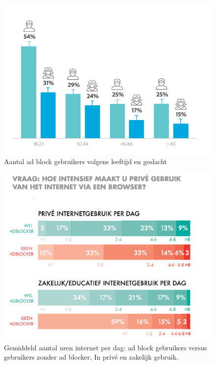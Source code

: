 \documentclass[pdftex,a4paper,12pt,twoside]{report}
\begin{document}
\begin{figure}[h!]
\centering
\includegraphics[width=12cm]{img/demographicsMV}
\caption{Aantal ad block gebruikers volgens leeftijd en geslacht}
\label{fig: Demographic_age_sex}
\end{figure}

\begin{figure}[h!]
\centering
\includegraphics[width=12cm]{img/adbvsnadbHoursofIntertnet}
\caption{Gemiddeld aantal uren internet per dag: ad block gebruikers versus gebruikers zonder ad blocker, In privé en zakelijk gebruik. }
\label{fig: adbvsnadbHoursofIntertnet}
\end{figure}
\end{document}
